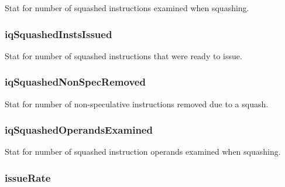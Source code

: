 \label{classInstructionQueue_a8312e8984bcfab5a77de40e1738103db}
Stat for number of squashed instructions examined when squashing. \hypertarget{classInstructionQueue_ac91799c895e5aff3af0afdbd7691a163}{
\subsubsection[{iqSquashedInstsIssued}]{ {\bf iqSquashedInstsIssued}}}
\label{classInstructionQueue_ac91799c895e5aff3af0afdbd7691a163}
Stat for number of squashed instructions that were ready to issue. \hypertarget{classInstructionQueue_a6c0b47431b6e84536fd9bb61624d6d97}{
\subsubsection[{iqSquashedNonSpecRemoved}]{ {\bf iqSquashedNonSpecRemoved}}}
\label{classInstructionQueue_a6c0b47431b6e84536fd9bb61624d6d97}
Stat for number of non-\/speculative instructions removed due to a squash. \hypertarget{classInstructionQueue_a4398b6005b81008bd163bbba78dfd929}{
\subsubsection[{iqSquashedOperandsExamined}]{ {\bf iqSquashedOperandsExamined}}}
\label{classInstructionQueue_a4398b6005b81008bd163bbba78dfd929}
Stat for number of squashed instruction operands examined when squashing. \hypertarget{classInstructionQueue_a6a9ed0564894e83d4c3c5784f667c5e0}{
\subsubsection[{issueRate}]{ {\bf issueRate}}}
